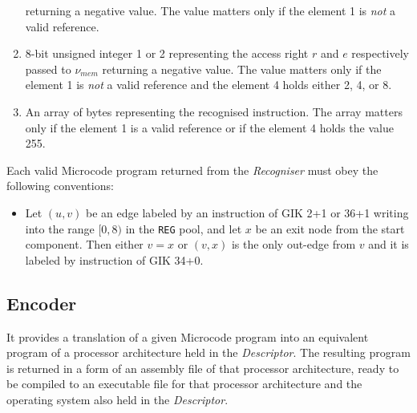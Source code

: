 \documentclass[10pt,twocolumn]{article}
\begin{document}
\begin{enumerate}
returning a negative value. The value matters only if the element 1 is
\emph{not} a valid reference. %
\item 8-bit unsigned integer 1 or 2 representing the access right $ r $ and $ e
$ respectively passed to $ \nu_\mathit{mem} $ returning a negative value. The
value matters only if the element 1 is \emph{not} a valid reference and the
element 4 holds either 2, 4, or 8. %
\item An array of bytes representing the recognised instruction. The array
matters only if the element 1 is a valid reference or if the element 4 holds the
value 255. %
\end{enumerate}

\noindent %
Each valid Microcode program returned from the \textit{Recogniser} must obey the
following conventions:

\begin{itemize}
\item Let $ (u,v) $ be an edge labeled by an instruction of GIK 2+1 or 36+1 writing into the range $ [0,8) $ in the \texttt{REG} pool, and let $ x $ be an exit node from the start component. Then either $ v = x $ or $ (v,x) $ is the only out-edge from $ v $ and it is labeled by instruction of GIK 34+0.
\end{itemize}

\subsection{Encoder}
\label{sec:MAL:encoder}

It provides a translation of a given Microcode program into an equivalent
program of a processor architecture held in the \emph{Descriptor}. The resulting
program is returned in a form of an assembly file of that processor
architecture, ready to be compiled to an executable file for that processor
architecture and the operating system also held in the \emph{Descriptor}.


\clearpage

\end{document}
